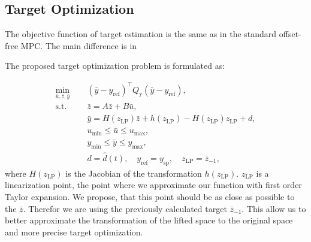 \documentclass[preprint,12pt,authoryear]{elsarticle}
\newcommand{\ui}[2]{#1_{\text{#2}}}
\begin{document}
\subsection{Target Optimization}

The objective function of target estimation is the same as in the standard offset-free MPC. The main difference is in 

The proposed target optimization problem is formulated as:

\begin{subequations}
  \label{eq:cs:target}
  \begin{align}
    \min_{\bar{u}, \bar{z}, \bar{y}} \quad & \; (\bar{y} - y_\text{ref})^\intercal Q_\text{y} (\bar{y} - y_\text{ref}), \label{eq:cs:target:obj} \\
    \text{s.t.} \quad & \; \bar{z} = A\bar{z} + B\bar{u}, \label{eq:cs:target:z} \\
    & \; \bar{y} = H(\ui{z}{LP})\bar{z} + h(\ui{z}{LP}) - H(\ui{z}{LP})\ui{z}{LP} + d, \label{eq:cs:target:y} \\
    & \; u_{\min} \leq \bar{u} \leq u_{\max}, \label{eq:cs:target:u} \\
    & \; y_{\min} \leq \bar{y} \leq y_{\max}, \label{eq:cs:target:ycon} \\
    & \; d = \hat{d}(t), \quad y_\text{ref} = y_\text{sp}, \quad \ui{z}{LP} = \bar{z}_{-1}, \label{eq:cs:target:params}
  \end{align}
\end{subequations}
where \(H(\ui{z}{LP})\) is the Jacobian of the transformation \(h(\ui{z}{LP})\). \(\ui{z}{LP}\) is a linearization point, the point where we approximate our function with first order Taylor expansion. We propose, that this point should be as close as possible to the \(\bar{z}\). Therefor we are using the previously calculated target \(\bar{z}_{-1}\). This allow us to better approximate the transformation of the lifted space to the original space and more precise target optimization.  
\end{document}
